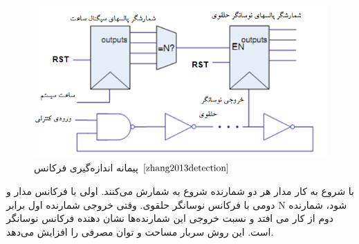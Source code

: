 \begin{figure}
	\begin{center}
		\includegraphics[scale=1]{figs/fig3-5.png}
		\caption[پیمانه اندازه‌گیری فرکانس]
		{پیمانه اندازه‌گیری فرکانس
			$\cite{zhang2013detection}$}
		\label{fig3-5}
	\end{center}
\end{figure} 
با شروع به کار مدار هر دو شمارنده شروع به شمارش می‌کنند. اولی با فرکانس مدار و دومی با فرکانس نوسانگر حلقوی. وقتی خروجی شمارنده اول برابر N شود، شمارنده دوم از کار می افتد و نسبت خروجی این شمارنده‌ها نشان دهنده فرکانس نوسانگر است. این روش سربار مساحت و توان مصرفی را افزایش می‌دهد.

